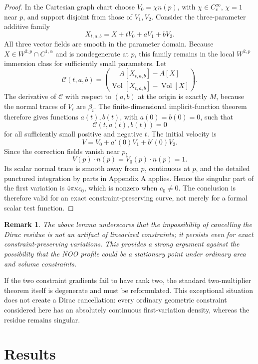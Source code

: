\documentclass[preprint,amsmath,amssymb,aps,prl,superscriptaddress,nofootinbib,floatfix]{revtex4-2}
\newtheorem{remark}[theorem]{Remark}
\begin{document}
\begin{proof}
In the Cartesian graph chart choose \(V_0=\chi n(p)\), with \(\chi\in C_c^\infty\), \(\chi=1\) near \(p\), and support disjoint from those of \(V_1,V_2\). Consider the three-parameter additive family
\[
X_{t,a,b}=X+tV_0+aV_1+bV_2.
\]
All three vector fields are smooth in the parameter domain. Because \(X\in W^{2,p}\cap C^{1,\alpha}\) and is nondegenerate at \(p\), this family remains in the local \(W^{2,p}\) immersion class for sufficiently small parameters. Let
\[
\mathcal C(t,a,b)=\binom{A[X_{t,a,b}]-A[X]}{\operatorname{Vol}[X_{t,a,b}]-\operatorname{Vol}[X]}.
\]
The derivative of \(\mathcal C\) with respect to \((a,b)\) at the origin is exactly \(M\), because the normal traces of \(V_i\) are \(\beta_i\). The finite-dimensional implicit-function theorem therefore gives functions \(a(t),b(t)\), with \(a(0)=b(0)=0\), such that
\[
\mathcal C(t,a(t),b(t))=0
\]
for all sufficiently small positive and negative \(t\). The initial velocity is
\[
V=V_0+a'(0)V_1+b'(0)V_2.
\]
Since the correction fields vanish near \(p\),
\[
V(p)\cdot n(p)=V_0(p)\cdot n(p)=1.
\]
Its scalar normal trace is smooth away from \(p\), continuous at \(p\), and the detailed punctured integration by parts in Appendix A applies. Hence the singular part of the first variation is \(4\pi\kappa c_0\), which is nonzero when \(c_0\ne0\). The conclusion is therefore valid for an exact constraint-preserving curve, not merely for a formal scalar test function.
\end{proof}

\begin{remark}
The above lemma underscores that the impossibility of cancelling the Dirac residue is not an artifact of linearized constraints; it persists even for exact constraint-preserving variations. This provides a strong argument against the possibility that the NOO profile could be a stationary point under ordinary area and volume constraints.
\end{remark}

If the two constraint gradients fail to have rank two, the standard two-multiplier theorem itself is degenerate and must be reformulated. This exceptional situation does not create a Dirac cancellation: every ordinary geometric constraint considered here has an absolutely continuous first-variation density, whereas the residue remains singular.

\section{Results}\label{sec:results}
\end{document}
